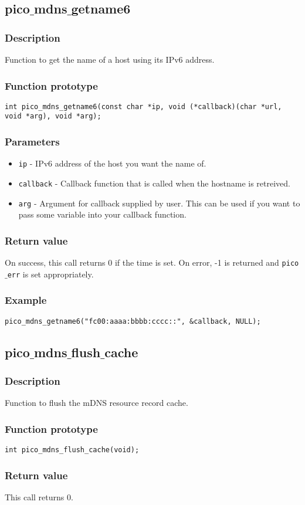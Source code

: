 \subsection{pico$\_$mdns$\_$getname6}

\subsubsection*{Description}
Function to get the name of a host using its IPv6 address.

\subsubsection*{Function prototype}
\begin{verbatim}
int pico_mdns_getname6(const char *ip, void (*callback)(char *url, void *arg), void *arg);
\end{verbatim}

\subsubsection*{Parameters}
\begin{itemize}[noitemsep]
\item \texttt{ip} - IPv6 address of the host you want the name of.
\item \texttt{callback} - Callback function that is called when the hostname is retreived.
\item \texttt{arg} - Argument for callback supplied by user. This can be used if you want to pass some variable into your callback function.
\end{itemize}

\subsubsection*{Return value}
On success, this call returns 0 if the time is set.
On error, -1 is returned and \texttt{pico$\_$err} is set appropriately.

\subsubsection*{Example}
\begin{verbatim}
pico_mdns_getname6("fc00:aaaa:bbbb:cccc::", &callback, NULL);
\end{verbatim}

\subsection{pico$\_$mdns$\_$flush$\_$cache}

\subsubsection*{Description}
Function to flush the mDNS resource record cache.

\subsubsection*{Function prototype}
\begin{verbatim}
int pico_mdns_flush_cache(void);
\end{verbatim}

\subsubsection*{Return value}
This call returns 0.
